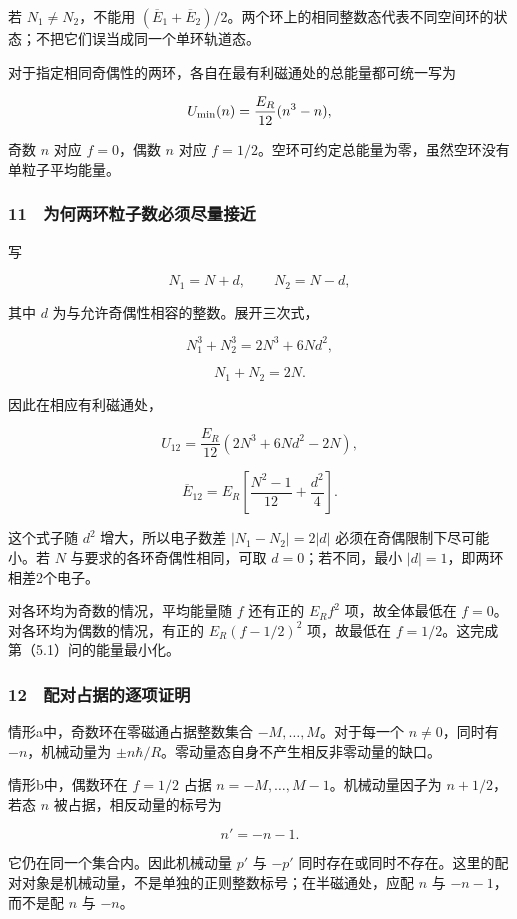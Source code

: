 \documentclass[12pt,a4paper,fontset=fandol]{ctexart}
\begin{document}
若 \(N_1\ne N_2\)，不能用
\((\overline E_1+\overline E_2)/2\)。两个环上的相同整数态代表不同空间环的状态；不把它们误当成同一个单环轨道态。

对于指定相同奇偶性的两环，各自在最有利磁通处的总能量都可统一写为

\[U_{\rm min}(n)=\frac{E_R}{12}(n^3-n),\]

奇数 \(n\) 对应 \(f=0\)，偶数 \(n\) 对应
\(f=1/2\)。空环可约定总能量为零，虽然空环没有单粒子平均能量。

\subsubsection{11　为何两环粒子数必须尽量接近}\label{ux4e3aux4f55ux4e24ux73afux7c92ux5b50ux6570ux5fc5ux987bux5c3dux91cfux63a5ux8fd1}

写

\[N_1=N+d,\qquad N_2=N-d,\]

其中 \(d\) 为与允许奇偶性相容的整数。展开三次式，

\[N_1^3+N_2^3=2N^3+6Nd^2,\]

\[N_1+N_2=2N.\]

因此在相应有利磁通处，

\[U_{12}=\frac{E_R}{12}(2N^3+6Nd^2-2N),\]

\[\boxed{\overline E_{12}
=E_R\left[\frac{N^2-1}{12}+\frac{d^2}{4}\right].}\]

这个式子随 \(d^2\) 增大，所以电子数差 \(|N_1-N_2|=2|d|\)
必须在奇偶限制下尽可能小。若 \(N\) 与要求的各环奇偶性相同，可取
\(d=0\)；若不同，最小 \(|d|=1\)，即两环相差2个电子。

对各环均为奇数的情况，平均能量随 \(f\) 还有正的 \(E_Rf^2\)
项，故全体最低在 \(f=0\)。对各环均为偶数的情况，有正的 \(E_R(f-1/2)^2\)
项，故最低在 \(f=1/2\)。这完成第（5.1）问的能量最小化。

\subsubsection{12　配对占据的逐项证明}\label{ux914dux5bf9ux5360ux636eux7684ux9010ux9879ux8bc1ux660e}

情形a中，奇数环在零磁通占据整数集合 \(-M,\ldots,M\)。对于每一个
\(n\ne0\)，同时有 \(-n\)，机械动量为
\(\pm n\hbar/R\)。零动量态自身不产生相反非零动量的缺口。

情形b中，偶数环在 \(f=1/2\) 占据 \(n=-M,\ldots,M-1\)。机械动量因子为
\(n+1/2\)，若态 \(n\) 被占据，相反动量的标号为

\[n'=-n-1.\]

它仍在同一个集合内。因此机械动量 \(p'\) 与 \(-p'\)
同时存在或同时不存在。这里的配对对象是机械动量，不是单独的正则整数标号；在半磁通处，应配
\(n\) 与 \(-n-1\)，而不是配 \(n\) 与 \(-n\)。
\end{document}

